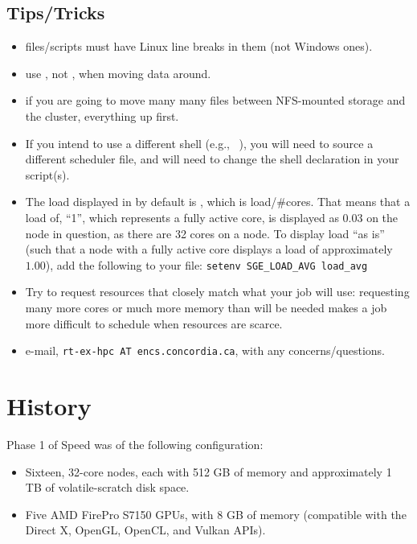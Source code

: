 \documentclass{easychair}
\begin{document}
\subsection{Tips/Tricks}

\begin{itemize}
\item
files/scripts must have Linux line breaks in them (not Windows ones).
\item
use , not , when moving data around. 
\item
if you are going to move many many files between NFS-mounted storage and the 
cluster,  everything up first. 
\item
If you intend to use a different shell (e.g., ~\cite{aosa-book-vol1-bash}), you will need to source a different scheduler file, and will need to change the shell declaration in your script(s).
\item
The load displayed in  by default is , which is load/\#cores. That means that a load of, ``1'', which represents a fully active core, is displayed as $0.03$ on the node in question, as there are 32 cores on a node. To display load ``as is'' (such that a node with a fully active core displays a load of approximately $1.00$), add the following to your  file: \texttt{setenv SGE\_LOAD\_AVG load\_avg}
\item
Try to request resources that closely match what your job will use: requesting many more cores or much more memory than will be needed makes a job more difficult to schedule when resources are scarce.
\item
e-mail, \texttt{rt-ex-hpc AT encs.concordia.ca}, with any concerns/questions.
\end{itemize}

\appendix

\section{History}

Phase 1 of Speed was of the following configuration:

\begin{itemize}
\item
Sixteen, 32-core nodes, each with 512 GB of memory and approximately 1 TB of volatile-scratch disk space. 
\item
Five AMD FirePro S7150 GPUs, with 8 GB of memory (compatible with the Direct X, OpenGL, OpenCL, and Vulkan APIs). 
\end{itemize}
\end{document}
